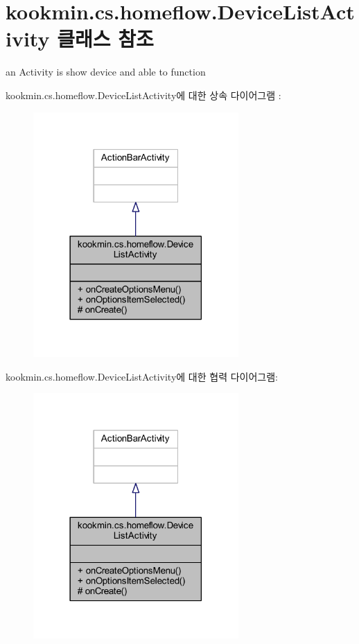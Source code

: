 \hypertarget{classkookmin_1_1cs_1_1homeflow_1_1_device_list_activity}{}\section{kookmin.\+cs.\+homeflow.\+Device\+List\+Activity 클래스 참조}
\label{classkookmin_1_1cs_1_1homeflow_1_1_device_list_activity}


an Activity is show device and able to function  




kookmin.\+cs.\+homeflow.\+Device\+List\+Activity에 대한 상속 다이어그램 \+: \nopagebreak
\begin{figure}[H]
\begin{center}
\leavevmode
\includegraphics[width=222pt]{classkookmin_1_1cs_1_1homeflow_1_1_device_list_activity__inherit__graph}
\end{center}
\end{figure}


kookmin.\+cs.\+homeflow.\+Device\+List\+Activity에 대한 협력 다이어그램\+:\nopagebreak
\begin{figure}[H]
\begin{center}
\leavevmode
\includegraphics[width=222pt]{classkookmin_1_1cs_1_1homeflow_1_1_device_list_activity__coll__graph}
\end{center}
\end{figure}

